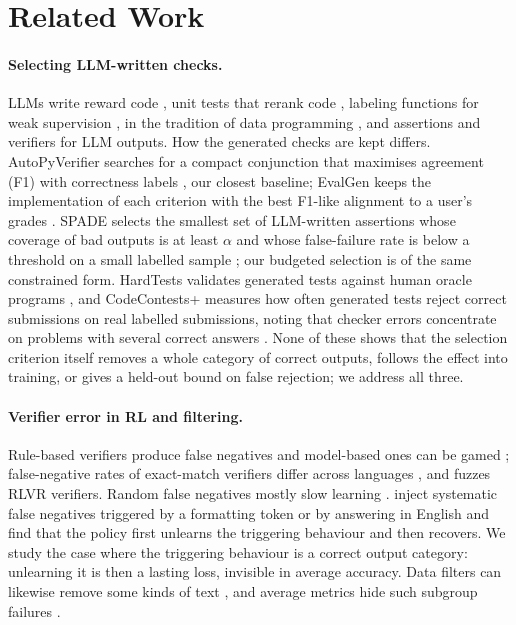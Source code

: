 \documentclass[11pt]{article}
\begin{document}
\section{Related Work}\label{sec:related}
\paragraph{Selecting LLM-written checks.} LLMs write reward code
\citep{ma2024eureka}, unit tests that rerank code \citep{chen2023codet},
labeling functions for weak supervision \citep{scriptoriumws2025}, in the
tradition of data programming \citep{ratner2016data,ratner2017snorkel},
and assertions and verifiers for LLM outputs. How the generated checks are
kept differs. AutoPyVerifier searches for a compact conjunction that
maximises agreement (F1) with correctness labels \citep{autopyverifier2026},
our closest baseline; EvalGen keeps the implementation of each criterion
with the best F1-like alignment to a user's grades
\citep{shankar2024validators}. SPADE selects the smallest set of
LLM-written assertions whose coverage of bad outputs is at least $\alpha$
and whose false-failure rate is below a threshold on a small labelled sample
\citep{shankar2024spade}; our budgeted selection is of the same
constrained form. HardTests validates generated tests against human oracle
programs \citep{hardtests2025}, and CodeContests+ measures how often
generated tests reject correct submissions on real labelled submissions,
noting that checker errors concentrate on problems with several correct
answers \citep{wang-etal-2025-codecontests}. None of these shows that the
selection criterion itself removes a whole category of correct outputs,
follows the effect into training, or gives a held-out bound on false
rejection; we address all three.

\paragraph{Verifier error in RL and filtering.} Rule-based verifiers
produce false negatives and model-based ones can be gamed
\citep{tinyv2025,pitfalls2025verifiers}; false-negative rates of
exact-match verifiers differ across languages \citep{zhou2026multilingual},
and \citet{ray2026fuzzing} fuzzes RLVR verifiers. Random false negatives
mostly slow learning \citep{rad2026rate}. \citet{egashira2026delay} inject
systematic false negatives triggered by a formatting token or by answering
in English and find that the policy first unlearns the triggering behaviour
and then recovers. We study the case where the triggering behaviour is a
correct output category: unlearning it is then a lasting loss, invisible in
average accuracy. Data filters can likewise remove some kinds of text
\citep{gururangan-etal-2022-whose}, and average metrics hide such subgroup
failures \citep{oakdenrayner2020hidden,sagawa2020dro}.
\end{document}
